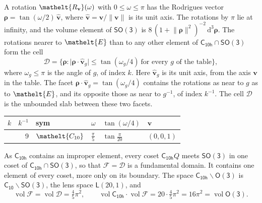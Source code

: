 \documentclass[10pt,a4paper]{article}
\numberwithin{equation}{section}
\newcommand{\eltfont}[1]{{\let\sigma\eltsigma\mathelt{#1}}}
\newcommand{\grp}[1]{\mathsf{#1}}
\newcommand{\cls}[1]{\eltfont{#1}}
\newcommand{\elt}[1]{\eltfont{#1}}
\newcommand{\dirvec}[3]{(#1, #2, #3)}
\newcommand{\unitaxis}{\hat{\mathbf{v}}}
\newcommand{\vv}{\mathbf{v}}
\newcommand{\diff}{\mathrm{d}}
\newcommand{\vol}{\operatorname{vol}}
\newcommand{\rodrigues}{\boldsymbol{\rho}}
\newcommand{\fcell}{\mathcal{D}}
\newcommand{\fdomain}{\mathcal{F}}
\newcommand{\lensspace}[2]{\mathsf{L}(#1, #2)}
\begin{document}
\leavevmode\label{n:vector.rodrigues}\label{n:vector.unitaxis}A rotation $\elt{R_{\vv}}(\omega)$ with $0 \le \omega \le \pi$ has the Rodrigues vector $\rodrigues = \tan(\omega/2)\,\unitaxis$, where $\unitaxis = \vv/\lVert\vv\rVert$ is its unit axis. The rotations by $\pi$ lie at infinity, and the volume element of \href{SO3.pdf}{$\grp{SO(3)}$} is $8\,(1 + \lVert\rodrigues\rVert^2)^{-2}\,\diff^3\rodrigues$.
\leavevmode\label{n:set.cell}The rotations nearer to $\elt{E}$ than to any other element of $\grp{C_{10h}} \cap \grp{SO(3)}$ form the cell
\begin{equation}\label{e:cell}\fcell = \bigl\{\rodrigues : \lvert\rodrigues\cdot\unitaxis_g\rvert \le \tan(\omega_g/4)\ \text{for every $g$ of the table}\bigr\},\end{equation}
where $\omega_g \le \pi$ is the angle of $g$, of index $k$. Here $\unitaxis_g$ is its unit axis, from the axis $\vv$ in the table. The facet $\rodrigues\cdot\unitaxis_g = \tan(\omega_g/4)$ contains the rotations as near to $g$ as to $\elt{E}$, and its opposite those as near to $g^{-1}$, of index $k^{-1}$. The cell $\fcell$ is the unbounded slab between these two facets.
{\small{\renewcommand{\arraystretch}{1.3}\begin{longtable}{@{}rrllll@{}}\toprule
$k$ & $k^{-1}$ & sym & $\omega$ & $\tan(\omega/4)$ & $\vv$\\\midrule\endhead
\bottomrule\endfoot\endlastfoot
1 & 9 & $\cls{C_{10}}$ & $\tfrac{\pi}{5}$ & $\tan\tfrac{\pi}{20}$ & $\dirvec{0}{0}{1}$\\
\bottomrule\end{longtable}}}

\leavevmode\label{n:set.fundamental}As $\grp{C_{10h}}$ contains an improper element, every coset $\grp{C_{10h}}Q$ meets \href{SO3.pdf}{$\grp{SO(3)}$} in one coset of $\grp{C_{10h}} \cap \grp{SO(3)}$, so that $\fdomain = \fcell$ is a fundamental domain. It contains one element of every coset, more only on its boundary.
\leavevmode\label{n:set.lens}The space $\grp{C_{10h}}\backslash\grp{O(3)}$ is $\grp{C_{10}}\backslash\grp{SO(3)}$, the lens space $\lensspace{20}{1}$, and
\begin{equation}\label{e:volume}\vol\fdomain = \vol\fcell = \tfrac{4}{5}\pi^2,\qquad \vol\grp{C_{10h}}\cdot\vol\fdomain = 20\cdot \tfrac{4}{5}\pi^2 = 16\pi^2 = \vol\grp{O(3)}.\end{equation}
\end{document}
